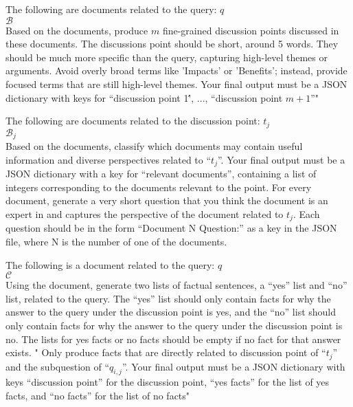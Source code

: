 \hypersetup{
    colorlinks=true, %
    linkcolor=white, %
    citecolor=white, %
    urlcolor=white %
}

\begin{prompt}[title={Prompt \thetcbcounter: Agenda Planner Prompt (\cref{subsection:agenda})}, label=prompt:agenda]
The following are documents related to the query: $q$\\
\texttt{$\mathcal{B}$} \\
Based on the documents, produce $m$ fine-grained discussion points discussed in these documents. The discussions point should be short, around 5 words. They should be much more specific than the query, capturing high-level themes or arguments. Avoid overly broad terms like 'Impacts' or 'Benefits'; instead, provide focused terms that are still high-level themes. Your final output must be a JSON dictionary with keys for ``discussion point 1\'', ..., ``discussion point $m+1$''"
\end{prompt}

\begin{prompt}[title={Prompt \thetcbcounter: Speaker Selection Prompt (\cref{subsection:moderator})}, label=prompt:moderator]
The following are documents related to the discussion point: $t_j$\\
\texttt{$\mathcal{B}_j$} \\
Based on the documents, classify which documents may contain useful information and diverse perspectives related to ``$t_j$''. Your final output must be a JSON dictionary with a key for ``relevant documents'', containing a list of integers corresponding to the documents relevant to the point.
For every document, generate a very short question that you think the document is an expert in and captures the perspective of the document related to $t_j$.
Each question should be in the form ``Document N Question:'' as a key in the JSON file, where N is the number of one of the documents.
\end{prompt}

\begin{prompt}[title={Prompt \thetcbcounter: Speaker Discussion Prompt (\cref{subsection:speaker})}, label=prompt:speaker]
The following is a document related to the query: $q$\\
$\mathcal{C}$ \\
Using the document, generate two lists of factual sentences, a ``yes'' list and ``no'' list, related to the query. The ``yes'' list should only contain facts for why the answer to the query under the discussion point is yes, and the ``no'' list should only contain facts for why the answer to the query under the discussion point is no. The lists for yes facts or no facts should be empty if no fact for that answer exists. "
Only produce facts that are directly related to discussion point of ``$t_j$'' and the subquestion of ``$q_{i, j}$''. Your final output must be a JSON dictionary with keys ``discussion point'' for the discussion point, ``yes facts'' for the list of yes facts, and ``no facts'' for the list of no facts"
\end{prompt}

